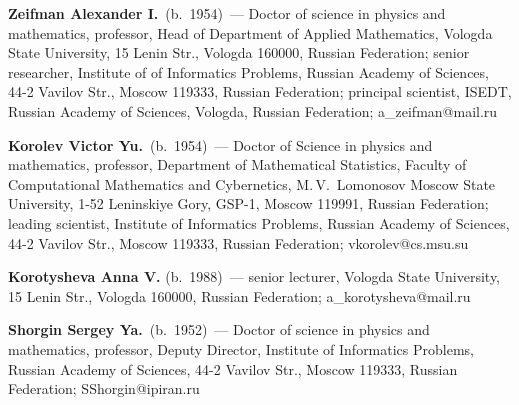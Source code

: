 \vspace*{-20pt}

\Contr


\textbf{Zeifman Alexander I.}\ (b.\ 1954)~--- Doctor of science in physics and
mathematics, professor, Head of Department  of Applied Mathematics, Vologda State University,
15 Lenin Str., Vologda 160000, Russian Federation;
senior researcher, Institute of of Informatics Problems, Russian Academy of Sciences,
44-2 Vavilov Str., Moscow 119333, Russian Federation;
principal scientist, ISEDT, Russian Academy of Sciences,
Vologda, Russian Federation; a\_zeifman@mail.ru

\vspace*{2pt}

\textbf{Korolev Victor Yu.}\ (b.\ 1954)~--- Doctor of Science in physics and mathematics, professor,
Department of Mathematical Statistics, Faculty of Computational Mathematics and Cybernetics,
M.\,V.~Lomonosov Moscow State University,
1-52 Leninskiye Gory, GSP-1, Moscow 119991, Russian Federation; leading scientist,
Institute of Informatics Problems, Russian Academy of Sciences,
44-2 Vavilov Str.,
Moscow 119333, Russian Federation; vkorolev@cs.msu.su

\vspace*{2pt}

\textbf{Korotysheva Anna V.} (b.\ 1988)~--- senior lecturer, Vologda State  University,
15 Lenin Str., Vologda 160000, Russian Federation;
a\_korotysheva@mail.ru

\vspace*{2pt}


\textbf{Shorgin Sergey Ya.}\ (b.\ 1952)~--- Doctor of science in physics and
mathematics, professor, Deputy Director, Institute of Informatics Problems,
Russian Academy of Sciences, 44-2 Vavilov Str.,
Moscow 119333, Russian Federation; SShorgin@ipiran.ru


 \label{end\stat}

\renewcommand{\bibname}{\protect\rm Литература}